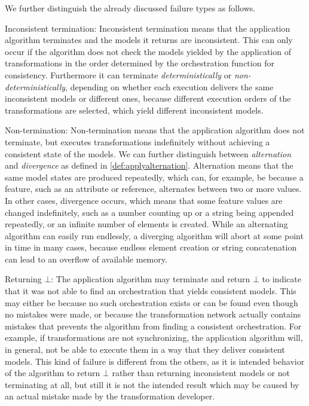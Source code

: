 We further distinguish the already discussed failure types as follows.
\begin{properdescription}
    \item[Inconsistent termination:] %
    Inconsistent termination means that the application algorithm terminates and the models it returns are inconsistent.
    This can only occur if the algorithm does not check the models yielded by the application of transformations in the order determined by the orchestration function for consistency.
    Furthermore it can terminate \emph{deterministically} or \emph{non-deterministically}, depending on whether each execution delivers the same inconsistent models or different ones, because different execution orders of the transformations are selected, which yield different inconsistent models.

    \item[Non-termination:] %
    Non-termination means that the application algorithm does not terminate, but executes transformations indefinitely without achieving a consistent state of the models.
    We can further distinguish between \emph{alternation} and \emph{divergence} as defined in \autoref{def:applyalternation}.
    Alternation means that the same model states are produced repeatedly, which can, for example, be because a feature, such as an attribute or reference, alternates between two or more values.
    In other cases, divergence occurs, which means that some feature values are changed indefinitely, such as a number counting up or a string being appended repeatedly, or an infinite number of elements is created.
    While an alternating algorithm can easily run endlessly, a diverging algorithm will abort at some point in time in many cases, because endless element creation or string concatenation can lead to an overflow of available memory.
    
    \item[Returning $\bot$:] %
    The application algorithm may terminate and return $\bot$ to indicate that it was not able to find an orchestration that yields consistent models.
    This may either be because no such orchestration exists or can be found even though no mistakes were made, or because the transformation network actually contains mistakes that prevents the algorithm from finding a consistent orchestration.
    For example, if transformations are not synchronizing, the application algorithm will, in general, not be able to execute them in a way that they deliver consistent models.
    This kind of failure is different from the others, as it is intended behavior of the algorithm to return $\bot$ rather than returning inconsistent models or not terminating at all, but still it is not the intended result which may be caused by an actual mistake made by the transformation developer.


\end{properdescription}
